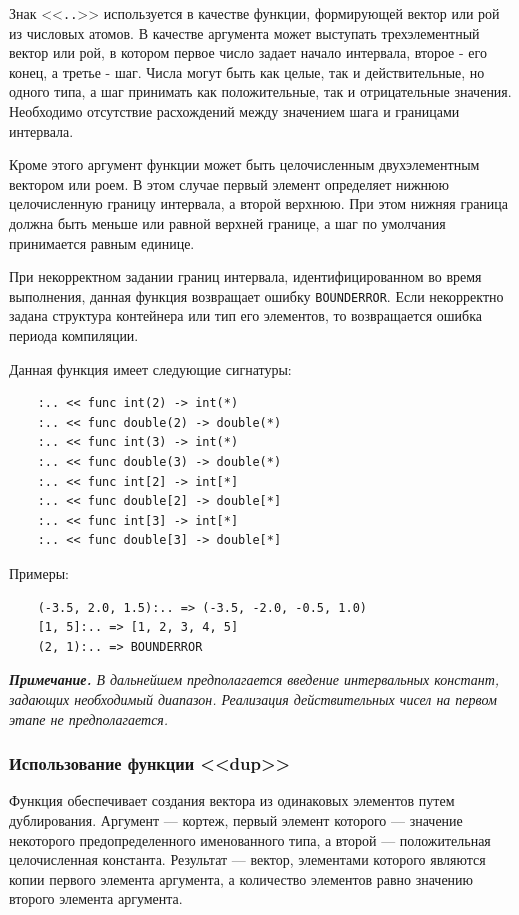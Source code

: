 Знак <<\verb|..|>> используется в качестве функции, формирующей вектор или рой из числовых атомов. В качестве аргумента может выступать трехэлементный вектор или рой, в котором первое число задает начало интервала, второе - его конец, а третье - шаг. Числа могут быть как целые, так и действительные, но одного типа, а шаг принимать как положительные, так и отрицательные значения. Необходимо отсутствие расхождений между значением шага и границами интервала.

Кроме этого аргумент функции может быть целочисленным двухэлементным вектором или роем. В этом случае первый элемент определяет нижнюю целочисленную границу интервала, а второй верхнюю. При этом нижняя граница должна быть меньше или равной верхней границе, а шаг по умолчания принимается равным единице.

При некорректном задании границ интервала, идентифицированном во время выполнения, данная функция возвращает ошибку \verb|BOUNDERROR|. Если некорректно задана структура контейнера или тип его элементов, то возвращается ошибка периода компиляции.

Данная функция имеет следующие сигнатуры:
\begin{verbatim}
    :.. << func int(2) -> int(*)
    :.. << func double(2) -> double(*)
    :.. << func int(3) -> int(*)
    :.. << func double(3) -> double(*)
    :.. << func int[2] -> int[*]
    :.. << func double[2] -> double[*]
    :.. << func int[3] -> int[*]
    :.. << func double[3] -> double[*]
\end{verbatim}

Примеры:
\begin{verbatim}
    (-3.5, 2.0, 1.5):.. => (-3.5, -2.0, -0.5, 1.0)
    [1, 5]:.. => [1, 2, 3, 4, 5]
    (2, 1):.. => BOUNDERROR
\end{verbatim}

\textit{\textbf{Примечание.} В дальнейшем предполагается введение интервальных констант, задающих необходимый диапазон. Реализация действительных чисел на первом этапе не предполагается.}

\subsubsection{Использование функции <<dup>>}

Функция обеспечивает создания вектора из одинаковых элементов путем дублирования. Аргумент --- кортеж, первый элемент которого --- значение некоторого предопределенного именованного типа, а второй --- положительная целочисленная константа. Результат --- вектор, элементами которого являются копии первого элемента аргумента, а количество элементов равно значению второго элемента аргумента.

